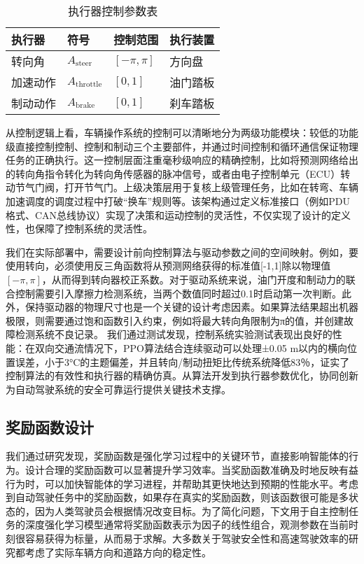 \begin{table}[htbp]
	\centering
	\caption{执行器控制参数表}
	\label{tab:actuators}
	\begin{tabular}{llll}
		\toprule
		\textbf{执行器} & \textbf{符号} & \textbf{控制范围} & \textbf{执行装置} \\
		\midrule
		转向角   & \( A_{\text{steer}} \)   & \(\left[-\pi, \pi\right]\)  & 方向盘 \\
		加速动作 & \( A_{\text{throttle}} \) & \([0, 1]\)                & 油门踏板 \\
		制动动作 & \( A_{\text{brake}} \)    & \([0, 1]\)                & 刹车踏板 \\
		\bottomrule
	\end{tabular}
\end{table}


从控制逻辑上看，车辆操作系统的控制可以清晰地分为两级功能模块：较低的功能级直接控制控制、控制和制动三个主要部件，并通过时间控制和循环通信保证物理任务的正确执行。这一控制层面注重毫秒级响应的精确控制，比如将预测网络给出的转向角指令转化为转向角传感器的脉冲信号，或者由电子控制单元（ECU）转动节气门阀，打开节气门。上级决策层用于复核上级管理任务，比如在转弯、车辆加速调度的调度过程中打破“换车”规则等。该架构通过定义标准接口（例如PDU格式、CAN总线协议）实现了决策和运动控制的灵活性，不仅实现了设计的定义性，也保障了控制系统的灵活性。

我们在实际部署中，需要设计前向控制算法与驱动参数之间的空间映射。例如，要使用转向，必须使用反三角函数将从预测网络获得的标准值[-1,1]除以物理值\([-π,π]\)，从而得到转向器校正系数。对于驱动系统来说，油门开度和制动力的联合控制需要引入摩擦力检测系统，当两个数值同时超过0.1时启动第一次判断。此外，保持驱动器的物理尺寸也是一个关键的设计考虑因素。如果算法结果超出机器极限，则需要通过饱和函数引入约束，例如将最大转向角限制为π的值，并创建故障检测系统不良记录。
我们通过测试发现，控制系统实验测试表现出良好的性能：在双向交通流情况下，PPO算法结合连续驱动可以处理±0.05 m以内的横向位置误差，小于3°C的主题偏差，并且转向/制动扭矩比传统系统降低83％，证实了控制算法的有效性和执行器的精确仿真。从算法开发到执行器参数优化，协同创新为自动驾驶系统的安全可靠运行提供关键技术支撑。

\subsection{奖励函数设计}

我们通过研究发现，奖励函数是强化学习过程中的关键环节，直接影响智能体的行为。设计合理的奖励函数可以显著提升学习效率。当奖励函数准确及时地反映有益行为时，可以加快智能体的学习进程，并帮助其更快地达到预期的性能水平。考虑到自动驾驶任务中的奖励函数，如果存在真实的奖励函数，则该函数很可能是多状态的，因为人类驾驶员会根据情况改变目标。为了简化问题，下文用于自主控制任务的深度强化学习模型通常将奖励函数表示为因子的线性组合，观测参数在当前时刻很容易获得为标量，从而易于求解。大多数关于驾驶安全性和高速驾驶效率的研究都考虑了实际车辆方向和道路方向的稳定性。

